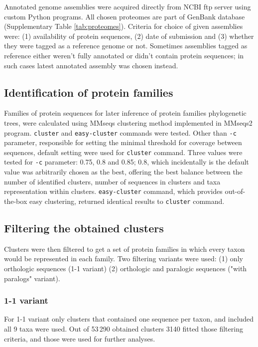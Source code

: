 \documentclass[two column, twoside, a4paper]{article}
\begin{document}
Annotated genome assemblies were acquired directly from NCBI ftp server using custom Python programs. All chosen proteomes are part of GenBank database (Supplementary Table \ref{tab:proteomes}). Criteria for choice of given assemblies were: (1) availability of protein sequences, (2) date of submission and (3) whether they were tagged as a reference genome or not. Sometimes assemblies tagged as reference either weren't fully annotated or didn't contain protein sequences; in such cases latest annotated assembly was chosen instead.

\subsection{Identification of protein families}

Families of protein sequences for later inference of protein families phylogenetic trees, were calculated using MMseqs clustering method implemented in MMseqs2 program\autocite{Steinegger2017, Steinegger2018, Mirdita2019}. \texttt{cluster} and \texttt{easy-cluster} commands were tested. Other than \texttt{-c} parameter, responsible for setting the minimal threshold for coverage between sequences, default setting were used for \texttt{cluster} command. Three values were tested for \texttt{-c} parameter: 0.75, 0.8 and 0.85; 0.8, which incidentally is the default value was arbitrarily chosen as the best, offering the best balance between the number of identified clusters, number of sequences in clusters and taxa representation within clusters. \texttt{easy-cluster} command, which provides out-of-the-box easy clustering, returned identical results to \texttt{cluster} command.

\subsection{Filtering the obtained clusters}

Clusters were then filtered to get a set of protein families in which every taxon would be represented in each family. Two filtering variants were used: (1) only orthologic sequences (1-1 variant) (2) orthologic and paralogic sequences ("with paralogs" variant).

\subsubsection{1-1 variant}

For 1-1 variant only clusters that contained one sequence per taxon, and included all 9 taxa were used. Out of 53\,290 obtained clusters 3140 fitted those filtering criteria, and those were used for further analyses.
\end{document}
